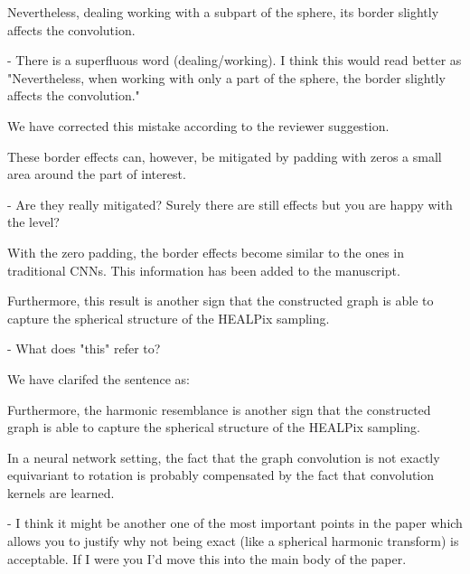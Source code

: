 \documentclass[12pt,a4paper]{article}
\newcommand{\nati}[1]{{\color[rgb]{.1,.6,.1}{NP: #1}}}
\newcommand{\todo}[1]{{\color[rgb]{.6,.1,.6}{TODO: #1}}}
\newcommand{\1}{\b{1}}              %
\newcommand{\0}{\b{0}}              %
\begin{document}
\begin{mdframed}[style=comment]
Nevertheless, dealing working with a subpart of the sphere, its border slightly affects the convolution.

- There is a superfluous word (dealing/working). I think this would read better as "Nevertheless, when working with only a part of the sphere, the border slightly affects the convolution."
\end{mdframed}
We have corrected this mistake according to the reviewer suggestion.

\begin{mdframed}[style=comment]
These border effects can, however, be mitigated by padding with zeros a small area around the part of interest.

- Are they really mitigated? Surely there are still effects but you are happy with the level?
\end{mdframed}
\todo{Assign: @nati, @michael}
With the zero padding, the border effects become similar to the ones in traditional CNNs.
This information has been added to the manuscript.

\begin{mdframed}[style=comment]
Furthermore, this result is another sign that the constructed graph is able to capture the spherical structure of the HEALPix sampling.

- What does "this" refer to?
\end{mdframed}
We have clarifed the sentence as:
\begin{mdframed}[style=manuscript]
Furthermore, the harmonic resemblance is another sign that the constructed graph is able to capture the spherical
structure of the HEALPix sampling.
\end{mdframed}

\begin{mdframed}[style=comment]
In a neural network setting, the fact that the graph convolution is not exactly equivariant to rotation is probably compensated by the fact that convolution kernels are learned.

- I think it might be another one of the most important points in the paper which allows you to justify why not being exact (like a spherical harmonic transform) is acceptable. If I were you I'd move this into the main body of the paper.
\end{mdframed}
\todo{Assign: @all, \nati{What do you think? I had the feeling we already have that in the main body of the paper. I cannot remember where, though.}}
\end{document}

